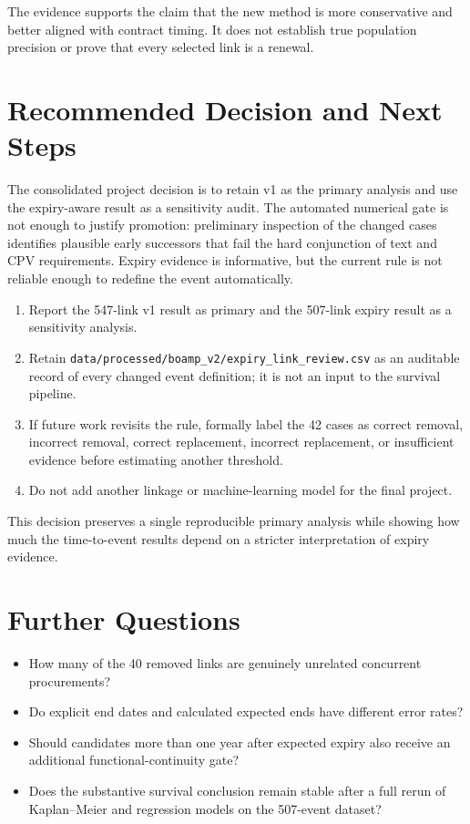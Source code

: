 \documentclass[11pt,a4paper]{article}
\newcommand{\pathcode}[1]{{\small\nolinkurl{#1}}}
\begin{document}
The evidence supports the claim that the new method is more conservative and better
aligned with contract timing. It does not establish true population precision or
prove that every selected link is a renewal.

\section{Recommended Decision and Next Steps}

The consolidated project decision is to retain v1 as the primary analysis and use the
expiry-aware result as a sensitivity audit. The automated numerical gate is not enough
to justify promotion: preliminary inspection of the changed cases identifies plausible
early successors that fail the hard conjunction of text and CPV requirements. Expiry
evidence is informative, but the current rule is not reliable enough to redefine the
event automatically.

\begin{enumerate}
  \item Report the 547-link v1 result as primary and the 507-link expiry result as a
  sensitivity analysis.
  \item Retain
  \pathcode{data/processed/boamp_v2/expiry_link_review.csv} as an auditable record of
  every changed event definition; it is not an input to the survival pipeline.
  \item If future work revisits the rule, formally label the 42 cases as correct
  removal, incorrect removal, correct replacement, incorrect replacement, or
  insufficient evidence before estimating another threshold.
  \item Do not add another linkage or machine-learning model for the final project.
\end{enumerate}

This decision preserves a single reproducible primary analysis while showing how much
the time-to-event results depend on a stricter interpretation of expiry evidence.

\section{Further Questions}

\begin{itemize}
  \item How many of the 40 removed links are genuinely unrelated concurrent procurements?
  \item Do explicit end dates and calculated expected ends have different error rates?
  \item Should candidates more than one year after expected expiry also receive an
  additional functional-continuity gate?
  \item Does the substantive survival conclusion remain stable after a full rerun of
  Kaplan--Meier and regression models on the 507-event dataset?
\end{itemize}
\end{document}

